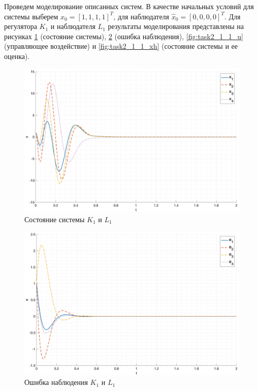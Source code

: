 Проведем моделирование описанных систем. В качестве начальных условий для системы выберем $x_0 = [1, 1, 1, 1]^T$, 
для наблюдателя $\hat{x}_0 = [0, 0, 0, 0]^T$. 
\FloatBarrier
Для регулятора $K_1$ и наблюдателя $L_1$ результаты моделирования представлены на рисунках \ref{fig:task2_1_1_x} 
(состояние системы), \ref{fig:task2_1_1_e} (ошибка наблюдения), \ref{fig:task2_1_1_u} (управляющее воздействие) и \ref{fig:task2_1_1_xh} 
(состояние системы и ее оценка).
\begin{figure}[ht!]
    \centering
    \includegraphics[width=\textwidth]{media/plots/task2_1_x.png}
    \caption{Состояние системы $K_1$ и $L_1$}
    \label{fig:task2_1_1_x}
\end{figure}
\begin{figure}[ht!]
    \centering
    \includegraphics[width=\textwidth]{media/plots/task2_1_e.png}
    \caption{Ошибка наблюдения $K_1$ и $L_1$}
    \label{fig:task2_1_1_e}
\end{figure}
